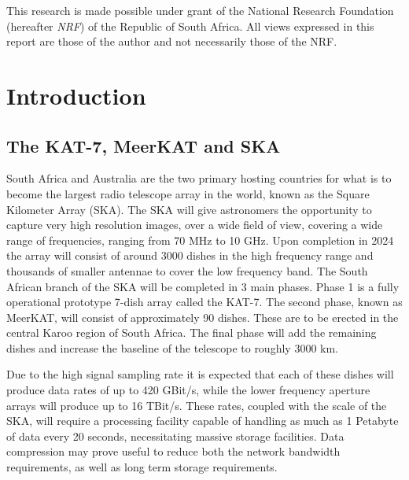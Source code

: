 This research is made possible under grant of the National Research Foundation (hereafter \textit{NRF}) of the Republic of South Africa. All views expressed in this report are those of the author and not 
necessarily those of the NRF.
\pagebreak
\glsaddall
\printglossary
\pagebreak
\tableofcontents
\pagebreak
\listoffigures
\pagebreak
{}
\section{Introduction}
\subsection{The KAT-7, MeerKAT and SKA}
South Africa and Australia are the two primary hosting countries for what is to become the largest radio telescope array in the world, known as the Square Kilometer Array (SKA). 
The SKA will give astronomers the opportunity to capture very high resolution images, over a wide field of view, covering a wide range of frequencies, ranging 
from 70 MHz to 10 GHz. Upon completion in 2024 the array will consist of around 3000 dishes in the high frequency range and thousands of smaller antennae to 
cover the low frequency band. The South African branch of the SKA will be completed in 3 main phases. Phase 1 is a fully operational prototype 7-dish array 
called the KAT-7. The second phase, known as MeerKAT, will consist of approximately 90 dishes. These are to be erected in the central Karoo region of South Africa. 
The final phase will add the remaining dishes and increase the baseline of the telescope to roughly 3000 km.

Due to the high signal sampling rate it is expected that each of these dishes will produce data rates of up to 420 GBit/s, while the lower frequency aperture arrays 
will produce up to 16 TBit/s. These rates, coupled with the scale of the SKA, will require a processing facility capable of handling as much as 1 Petabyte of 
data every 20 seconds, necessitating massive storage facilities. Data compression may prove useful to reduce both the network bandwidth requirements, as well as long term
storage requirements.
